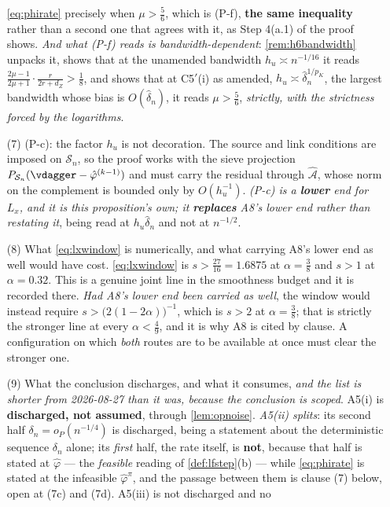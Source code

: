 \begin{remark}
\begin{enumerate}
{\eqref{eq:phirate} precisely when $\mu>\tfrac56$, which is (P-f), \textbf{the same inequality} rather
than a second one that agrees with it}, as Step 4(a.1) of the proof shows. \emph{And what (P-f) reads is
bandwidth-dependent}: \cref{rem:h6bandwidth} unpacks it, shows that at the unamended bandwidth
$h_u\asymp n^{-1/16}$ it reads
$\tfrac{2\mu-1}{2\mu+1}\cdot\tfrac{r}{2r+d_Z}>\tfrac18$, and shows that at C5$'$(i) as amended, 
$h_u\asymp\hat\delta_n^{1/p_K}$, the largest bandwidth whose bias is $O(\hat\delta_n)$, it reads
$\mu>\tfrac56$, \emph{strictly, with the strictness forced by the logarithms}.
\item[(7)] \textup{(P-c)}: the factor $h_u$ is not decoration. The source and link conditions are
imposed on $\mathcal S_n$, so the proof works with the sieve projection
$P_{\mathcal S_n}(\vdagger-\hat\varphi^{(k-1)})$ and must carry the residual through
$\hat{\mathcal A}$, whose norm on the complement is bounded only by $O(h_u^{-1})$. \emph{(P-c) is a
\textbf{lower} end for $L_x$, and it is this proposition's own; it \textbf{replaces} A8's lower end
rather than restating it}, being read at $h_u\hat\delta_n$ and not at $n^{-1/2}$.
\item[(8)] What \eqref{eq:lxwindow} is numerically, and what carrying A8's lower end as well would
have cost. \eqref{eq:lxwindow} is $s>\tfrac{27}{16}=1.6875$ at $\alpha=\tfrac38$ and $s>1$ at
$\alpha=0.32$. This is a genuine joint line in the smoothness budget and it is recorded there.
\emph{Had A8's lower end been carried as well}, the window would instead require
$s>\big(2(1-2\alpha)\big)^{-1}$, which is $s>2$ at $\alpha=\tfrac38$; that is strictly the stronger line
at every $\alpha<\tfrac49$, and it is why A8 is cited by clause. A configuration on which \emph{both}
routes are to be available at once must clear the stronger one.
\item[(9)] What the conclusion discharges, and what it consumes, \emph{and the list is shorter from
2026-08-27 than it was, because the conclusion is scoped}. A5(i) is \textbf{discharged, not
assumed}, through \cref{lem:opnoise}. \emph{A5(ii) splits}: its second half
$\delta_n=o_P(n^{-1/4})$ is discharged, being a statement about the deterministic sequence $\delta_n$
alone; its \emph{first} half, the rate itself, is \textbf{not}, because that half is stated at
$\hat\varphi$ --- the \emph{feasible} reading of \cref{def:lfstep}\textup{(b)} --- while
\eqref{eq:phirate} is stated at the infeasible $\hat\varphi^{\pi}$, and the passage between them is
clause \textup{(7)} below, open at \textup{(7c)} and \textup{(7d)}. A5(iii) is not discharged and no

\end{enumerate}
\end{remark}
